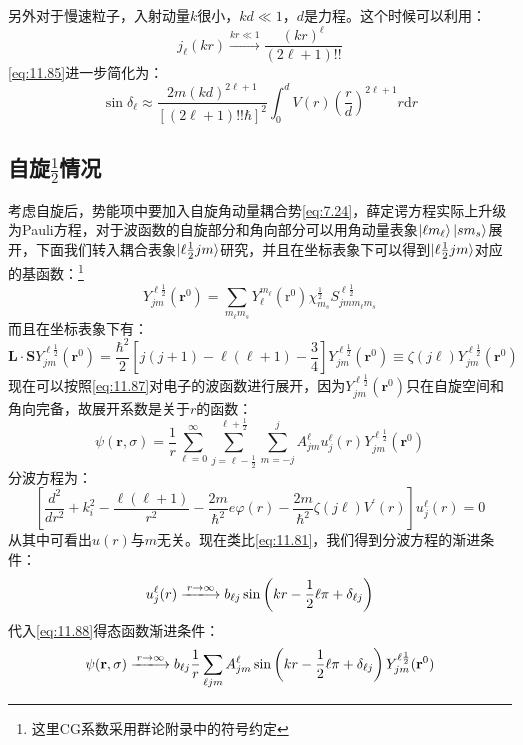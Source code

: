 \documentclass[a4paper,zihao=-4,linespread=1]{ctexrep}
\begin{document}
	另外对于慢速粒子，入射动量$k$很小，$kd\ll 1$，$d$是力程。这个时候可以利用：
	\[j_\ell(kr)\xrightarrow{kr\ll1}\frac{(kr)^\ell}{(2\ell+1)!!}\]
	\ref{eq:11.85}进一步简化为：
	\begin{equation}
		\sin\delta_\ell\approx\frac{2m(kd)^{2\ell+1}}{\left[(2\ell+1)!!\hbar\right]^2}\int_0^dV(r)\left(\frac{r}{d}\right)^{2\ell+1}r\mathrm{d}r
	\end{equation}
	
	\subsection{自旋$\frac{1}{2}$情况}
	考虑自旋后，势能项中要加入自旋角动量耦合势\ref{eq:7.24}，薛定谔方程实际上升级为Pauli方程，对于波函数的自旋部分和角向部分可以用角动量表象$\ket{\ell m_\ell}\ket{sm_s}$展开，下面我们转入耦合表象$\ket{\ell\frac{1}{2}jm}$研究，并且在坐标表象下可以得到$\ket{\ell\frac{1}{2}jm}$对应的基函数：\footnote{这里CG系数采用群论附录中的符号约定}
	\begin{equation}
		\label{eq:11.87}
		Y^{\ell\frac{1}{2}}_{jm}(\mathbf{r}^0)=\sum_{m_\ell m_s}Y^{m_\ell}_\ell (\mathrm{r}^0)\chi_{m_s}^\frac{1}{2}S_{jmm_\ell m_s}^{\ell\frac{1}{2}}
	\end{equation}
	而且在坐标表象下有：
	\[\mathbf{L}\cdot\mathbf{S}Y^{\ell\frac{1}{2}}_{jm}(\mathbf{r}^0)=\frac{\hbar^2}{2}\left[j(j+1)-\ell(\ell+1)-\frac{3}{4}\right]Y^{\ell\frac{1}{2}}_{jm}(\mathbf{r}^0)\equiv\zeta(j\ell)Y^{\ell\frac{1}{2}}_{jm}(\mathbf{r}^0)\]
	现在可以按照\ref{eq:11.87}对电子的波函数进行展开，因为$Y^{\ell\frac{1}{2}}_{jm}(\mathbf{r}^0)$只在自旋空间和角向完备，故展开系数是关于$r$的函数：
	\begin{equation}
		\label{eq:11.88}
		\psi(\mathbf{r},\sigma)=\frac{1}{r}\sum_{\ell=0}^\infty\sum_{j=\ell-\frac{1}{2}}^{\ell+\frac{1}{2}}\sum_{m=-j}^{j}A^{\ell}_{jm}u_j^\ell(r)Y^{\ell\frac{1}{2}}_{jm}(\mathbf{r}^0)
	\end{equation}
	分波方程为：
	\[\left[\frac{d^2}{dr^2}+k_i^2-\frac{\ell(\ell+1)}{r^2}-\frac{2m}{\hbar^2}e\varphi(r)-\frac{2m}{\hbar^2}\zeta(j\ell)V^\prime(r)\right]u_j^\ell(r)=0\]
	从其中可看出$u(r)$与$m$无关。现在类比\ref{eq:11.81}，我们得到分波方程的渐进条件：
	\[u_j^\ell(r)\xlongrightarrow{r\to\infty}b_{\ell j}\sin\left(kr-\frac{1}{2}\ell\pi+\delta_{\ell j}\right)\]
	代入\ref{eq:11.88}得态函数渐进条件：
	\begin{equation}
		\label{eq:11.89}
		\psi(\mathbf{r},\sigma)\xlongrightarrow{r\to\infty}b_{\ell j}\frac{1}{r}\sum_{\ell j m}A^{\ell}_{jm}\sin\left(kr-\frac{1}{2}\ell\pi+\delta_{\ell j}\right)Y^{\ell\frac{1}{2}}_{jm}(\mathbf{r}^0)
	\end{equation}
	
\end{document}
